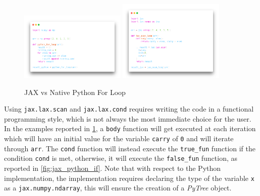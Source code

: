 \begin{figure}[h]
    \centering
    \caption{JAX vs Native Python For Loop}
    \label{fig:jax_python_forloop}
    \includegraphics[width=0.45\textwidth]{Images/python_forloop.png}
    \includegraphics[width=0.45\textwidth]{Images/jax_forloop.png}
\end{figure}

Using \texttt{jax.lax.scan} and \texttt{jax.lax.cond} requires writing the code in a functional programming style, which is not always the most immediate choice for the user. In the examples reported in \cref{fig:jax_python_forloop}, a \texttt{body} function will get executed at each iteration which will have an initial value for the variable \texttt{carry} of \texttt{0} and will iterate through \texttt{arr}. The \texttt{cond} function will instead execute the \texttt{true\_fun} function if the condition \texttt{cond} is met, otherwise, it will execute the \texttt{false\_fun} function, as reported in \cref{fig:jax_python_if}. Note that with respect to the Python implementation, the \jax implementation requires declaring the type of the variable \texttt{x} as a \texttt{jax.numpy.ndarray}, this will ensure the creation of a \textit{PyTree} object.

